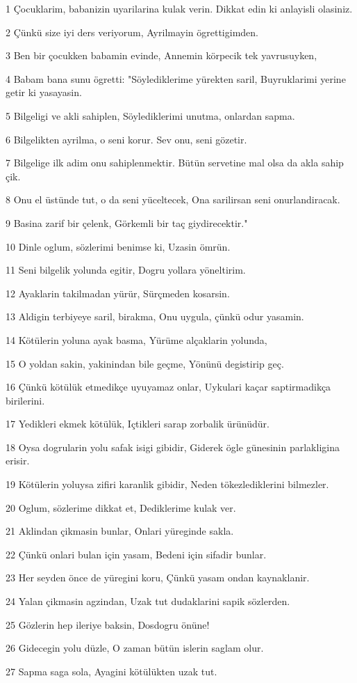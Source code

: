 \par 1 Çocuklarim, babanizin uyarilarina kulak verin. Dikkat edin ki anlayisli olasiniz.
\par 2 Çünkü size iyi ders veriyorum, Ayrilmayin ögrettigimden.
\par 3 Ben bir çocukken babamin evinde, Annemin körpecik tek yavrusuyken,
\par 4 Babam bana sunu ögretti: "Söylediklerime yürekten saril, Buyruklarimi yerine getir ki yasayasin.
\par 5 Bilgeligi ve akli sahiplen, Söylediklerimi unutma, onlardan sapma.
\par 6 Bilgelikten ayrilma, o seni korur. Sev onu, seni gözetir.
\par 7 Bilgelige ilk adim onu sahiplenmektir. Bütün servetine mal olsa da akla sahip çik.
\par 8 Onu el üstünde tut, o da seni yüceltecek, Ona sarilirsan seni onurlandiracak.
\par 9 Basina zarif bir çelenk, Görkemli bir taç giydirecektir."
\par 10 Dinle oglum, sözlerimi benimse ki, Uzasin ömrün.
\par 11 Seni bilgelik yolunda egitir, Dogru yollara yöneltirim.
\par 12 Ayaklarin takilmadan yürür, Sürçmeden kosarsin.
\par 13 Aldigin terbiyeye saril, birakma, Onu uygula, çünkü odur yasamin.
\par 14 Kötülerin yoluna ayak basma, Yürüme alçaklarin yolunda,
\par 15 O yoldan sakin, yakinindan bile geçme, Yönünü degistirip geç.
\par 16 Çünkü kötülük etmedikçe uyuyamaz onlar, Uykulari kaçar saptirmadikça birilerini.
\par 17 Yedikleri ekmek kötülük, Içtikleri sarap zorbalik ürünüdür.
\par 18 Oysa dogrularin yolu safak isigi gibidir, Giderek ögle günesinin parlakligina erisir.
\par 19 Kötülerin yoluysa zifiri karanlik gibidir, Neden tökezlediklerini bilmezler.
\par 20 Oglum, sözlerime dikkat et, Dediklerime kulak ver.
\par 21 Aklindan çikmasin bunlar, Onlari yüreginde sakla.
\par 22 Çünkü onlari bulan için yasam, Bedeni için sifadir bunlar.
\par 23 Her seyden önce de yüregini koru, Çünkü yasam ondan kaynaklanir.
\par 24 Yalan çikmasin agzindan, Uzak tut dudaklarini sapik sözlerden.
\par 25 Gözlerin hep ileriye baksin, Dosdogru önüne!
\par 26 Gidecegin yolu düzle, O zaman bütün islerin saglam olur.
\par 27 Sapma saga sola, Ayagini kötülükten uzak tut.

